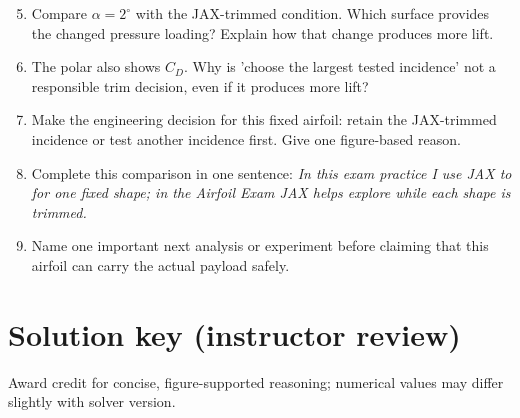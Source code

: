 \documentclass[11pt]{article}
\begin{document}
\begin{enumerate}
\setcounter{enumi}{4}
\item Compare $\alpha=2^\circ$ with the JAX-trimmed condition. Which surface provides the changed pressure loading? Explain how that change produces more lift.
\item The polar also shows $C_D$. Why is 'choose the largest tested incidence' not a responsible trim decision, even if it produces more lift?
\item Make the engineering decision for this fixed airfoil: retain the JAX-trimmed incidence or test another incidence first. Give one figure-based reason.
\item Complete this comparison in one sentence: \emph{In this exam practice I use JAX to \underline{\hspace{2cm}} for one fixed shape; in the Airfoil Exam JAX helps explore \underline{\hspace{2cm}} while each shape is trimmed.}
\item Name one important next analysis or experiment before claiming that this airfoil can carry the actual payload safely.
\end{enumerate}

\newpage
\section*{Solution key (instructor review)}
Award credit for concise, figure-supported reasoning; numerical values may differ slightly with solver version.
\end{document}
